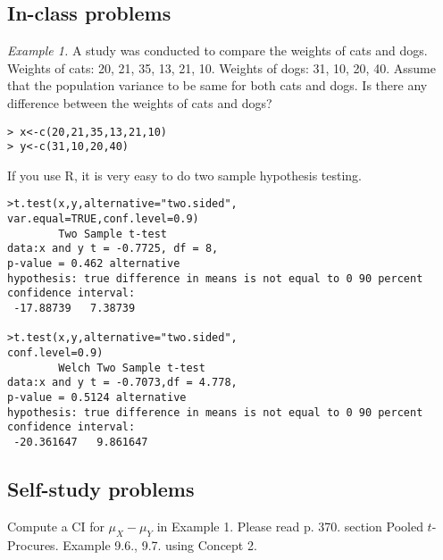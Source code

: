 \documentclass[11pt,twocolumn]{article} %
\begin{document}
\subsection*{In-class problems}  {\em Example 1.} A study
was conducted to compare the weights of cats and dogs. Weights of
cats: 20, 21, 35, 13, 21, 10. Weights of dogs: 31, 10, 20, 40.
Assume that the population variance to be same for both cats and
dogs. Is there any difference between the weights of cats and
dogs?
\begin{verbatim}
> x<-c(20,21,35,13,21,10)
> y<-c(31,10,20,40)
\end{verbatim}
If you use R, it is very easy to do two sample hypothesis testing.
\begin{verbatim}
>t.test(x,y,alternative="two.sided",
var.equal=TRUE,conf.level=0.9)
        Two Sample t-test
data:x and y t = -0.7725, df = 8,
p-value = 0.462 alternative
hypothesis: true difference in means is not equal to 0 90 percent
confidence interval:
 -17.88739   7.38739

>t.test(x,y,alternative="two.sided",
conf.level=0.9)
        Welch Two Sample t-test
data:x and y t = -0.7073,df = 4.778,
p-value = 0.5124 alternative
hypothesis: true difference in means is not equal to 0 90 percent
confidence interval:
 -20.361647   9.861647
\end{verbatim}

\subsection*{Self-study problems} Compute a CI for $\mu_X - \mu_Y$
in Example 1. Please read p. 370. section Pooled $t$-Procures.
Example 9.6., 9.7. using Concept 2.
\end{document}
